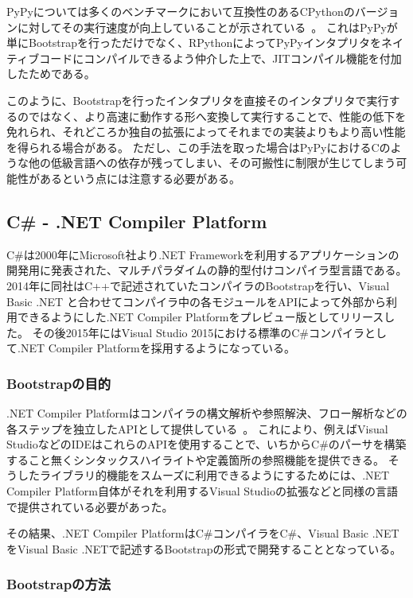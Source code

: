 PyPyについては多くのベンチマークにおいて互換性のあるCPythonのバージョンに対してその実行速度が向上していることが示されている~\cite{speed-pypy-org}。
これはPyPyが単にBootstrapを行っただけでなく、RPythonによってPyPyインタプリタをネイティブコードにコンパイルできるよう仲介した上で、JITコンパイル機能を付加したためである。

このように、Bootstrapを行ったインタプリタを直接そのインタプリタで実行するのではなく、より高速に動作する形へ変換して実行することで、性能の低下を免れられ、それどころか独自の拡張によってそれまでの実装よりもより高い性能を得られる場合がある。
ただし、この手法を取った場合はPyPyにおけるCのような他の低級言語への依存が残ってしまい、その可搬性に制限が生じてしまう可能性があるという点には注意する必要がある。


\subsection{C\# - .NET Compiler Platform}
\label{explain-bootstrap:instance:csharp}

C\#は2000年にMicrosoft社より.NET Frameworkを利用するアプリケーションの開発用に発表された、マルチパラダイムの静的型付けコンパイラ型言語である。
2014年に同社はC++で記述されていたコンパイラのBootstrapを行い、Visual Basic .NET と合わせてコンパイラ中の各モジュールをAPIによって外部から利用できるようにした.NET Compiler Platformをプレビュー版としてリリースした。
その後2015年にはVisual Studio 2015における標準のC\#コンパイラとして.NET Compiler Platformを採用するようになっている。

\subsubsection{Bootstrapの目的}

.NET Compiler Platformはコンパイラの構文解析や参照解決、フロー解析などの各ステップを独立したAPIとして提供している~\cite{roslyn-doc}。
これにより、例えばVisual StudioなどのIDEはこれらのAPIを使用することで、いちからC\#のパーサを構築すること無くシンタックスハイライトや定義箇所の参照機能を提供できる。
そうしたライブラリ的機能をスムーズに利用できるようにするためには、.NET Compiler Platform自体がそれを利用するVisual Studioの拡張などと同様の言語で提供されている必要があった。

その結果、.NET Compiler PlatformはC\#コンパイラをC\#、Visual Basic .NETをVisual Basic .NETで記述するBootstrapの形式で開発することとなっている。

\subsubsection{Bootstrapの方法}


